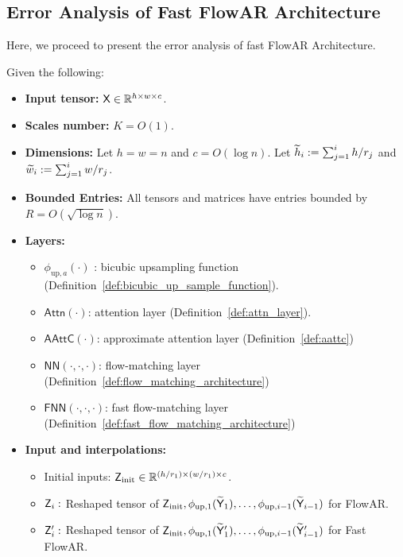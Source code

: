 \subsection{Error Analysis of Fast FlowAR Architecture}\label{sec:error_analysis_fast_flowar}
Here, we proceed to present the error analysis of fast FlowAR Architecture.
\begin{lemma}\label{lem:error_analysis_fast_flowar}
    Given the following:
    \begin{itemize}
        \item {\bf Input tensor:} $\mathsf{X} \in \mathbb{R}^{h \times w \times c}$.
        \item {\bf Scales number:} $K = O(1)$.
        \item {\bf Dimensions:} Let $h=w=n$ and $c = O(\log n)$. Let $\widetilde{h}_i := \sum_{j=1}^i h/r_j$ and $\widetilde{w}_i := \sum_{j=1}^i w/r_j$.
        \item {\bf Bounded Entries:} All tensors and matrices have entries bounded by $R = O(\sqrt{\log n})$.
        \item {\bf Layers:}
        \begin{itemize}
            \item $\phi_{\mathrm{up},a}(\cdot)$ :  bicubic upsampling function (Definition~\ref{def:bicubic_up_sample_function}).
            \item $\mathsf{Attn}(\cdot)$: attention layer (Definition~\ref{def:attn_layer}).
            \item $\mathsf{AAttC(\cdot)}$: approximate attention layer (Definition~\ref{def:aattc})
            \item $\mathsf{NN}(\cdot,\cdot,\cdot)$: flow-matching layer (Definition~\ref{def:flow_matching_architecture})
            \item $\mathsf{FNN}(\cdot,\cdot,\cdot)$: fast flow-matching layer (Definition~\ref{def:fast_flow_matching_architecture})
        \end{itemize}
        \item {\bf Input and interpolations:}
        \begin{itemize}
            \item Initial inputs: $\mathsf{Z}_{\mathrm{init}} \in \mathbb{R}^{(h/r_1)\times(w/r_1) \times c}$.
            \item $\mathsf{Z}_i:$ Reshaped tensor of  $\mathsf{Z}_{\mathrm{init}}, \phi_{\mathrm{up},1}(\widetilde{\mathsf{Y}}_1), \dots, \phi_{\mathrm{up},i-1}(\widetilde{\mathsf{Y}}_{i-1})$ for FlowAR.
            \item $\mathsf{Z}'_i:$ Reshaped tensor of  $\mathsf{Z}_{\mathrm{init}}, \phi_{\mathrm{up},1}(\widetilde{\mathsf{Y}}'_1), \dots, \phi_{\mathrm{up},i-1}(\widetilde{\mathsf{Y}}'_{i-1})$ for  Fast FlowAR.

\end{itemize}
\end{itemize}
\end{lemma}
